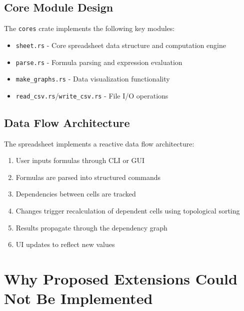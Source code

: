 \documentclass[12pt]{article}
\begin{document}
\subsection{Core Module Design}
The \texttt{cores} crate implements the following key modules:
\begin{itemize}
    \item \texttt{sheet.rs} - Core spreadsheet data structure and computation engine
    \item \texttt{parse.rs} - Formula parsing and expression evaluation
    \item \texttt{make\_graphs.rs} - Data visualization functionality
    \item \texttt{read\_csv.rs}/\texttt{write\_csv.rs} - File I/O operations
\end{itemize}

\subsection{Data Flow Architecture}
The spreadsheet implements a reactive data flow architecture:
\begin{enumerate}
    \item User inputs formulas through CLI or GUI
    \item Formulas are parsed into structured commands
    \item Dependencies between cells are tracked
    \item Changes trigger recalculation of dependent cells using topological sorting
    \item Results propagate through the dependency graph
    \item UI updates to reflect new values
\end{enumerate}

\section{Why Proposed Extensions Could Not Be Implemented}
\end{document}
